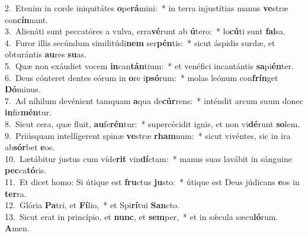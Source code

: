 {2.~}Etenim in corde iniquitátes \textbf{o}pe\textbf{rá}mini:~* in terra injustítias manus \textbf{ve}stræ con\textbf{cín}nant.\\
{3.~}Alienáti sunt peccatóres a vulva, erra\textbf{vé}runt ab \textbf{ú}tero:~* lo\textbf{cú}ti sunt \textbf{fal}sa.\\
{4.~}Furor illis secúndum similitúdi\textbf{nem} ser\textbf{pén}tis:~* sicut áspidis surdæ, et obturántis \textbf{au}res \textbf{su}as.\\
{5.~}Quæ non exáudiet vocem \textbf{in}can\textbf{tán}tium:~* et venéfici incantántis \textbf{sa}pi\textbf{én}ter.\\
{6.~}Deus cónteret dentes eórum in \textbf{o}re i\textbf{psó}rum:~* molas leónum con\textbf{frín}get \textbf{Dó}minus.\\
{7.~}Ad níhilum devénient tamquam \textbf{a}qua de\textbf{cúr}rens:~* inténdit arcum suum donec \textbf{in}fir\textbf{mén}tur.\\
{8.~}Sicut cera, quæ fluit, \textbf{au}fe\textbf{rén}tur:~* supercécidit ignis, et non vi\textbf{dé}runt \textbf{so}lem.\\
{9.~}Priúsquam intellígerent spinæ \textbf{ve}stræ \textbf{rham}num:~* sicut vivéntes, sic in ira ab\textbf{sór}bet \textbf{e}os.\\
{10.~}Lætábitur justus cum víde\textbf{rit} vin\textbf{dí}ctam:~* manus suas lavábit in sánguine \textbf{pec}ca\textbf{tó}ris.\\
{11.~}Et dicet homo: Si útique est \textbf{fru}ctus \textbf{ju}sto:~* útique est Deus júdicans \textbf{e}os in \textbf{ter}ra.\\
{12.~}Glória \textbf{Pa}tri, et \textbf{Fí}lio,~* et Spi\textbf{rí}tui \textbf{San}cto.\\
{13.~}Sicut erat in princípio, et \textbf{nunc}, et \textbf{sem}per,~* et in sǽcula sæcu\textbf{ló}rum. \textbf{A}men.\\
